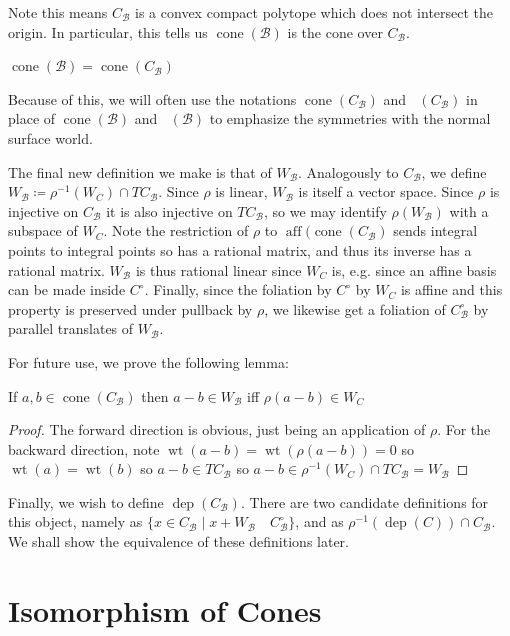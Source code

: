 \documentclass[12pt]{article}
\newcommand{\B}{\mathcal{B}}
\DeclareMathOperator{\dep}{dep}
\DeclareMathOperator{\wt}{wt}
\DeclareMathOperator{\cone}{cone^\circ}
\DeclareMathOperator{\ccone}{cone}
\DeclareMathOperator{\aff}{aff}
\theoremstyle{nonumberdefinition}
\theoremstyle{empty}
\theoremstyle{empty}
\begin{document}
Note this means $C_{\B}$ is a convex compact polytope which does not intersect the origin. In particular, this tells us $\ccone(\B)$ is the cone over $C_{\B}$.

\begin{corollary}\label{cor:ccone(B)=ccone(C_B)}
	$\ccone(\B) = \ccone(C_{\B})$
\end{corollary}

Because of this, we will often use the notations $\ccone(C_{\B})$ and $\cone(C_{\B})$ in place of $\ccone(\B)$ and $\cone(\B)$ to emphasize the symmetries with the normal surface world.

The final new definition we make is that of $W_{\B}$. Analogously to $C_{\B}$, we define $W_{\B} \coloneqq \rho^{-1}(W_C) \cap TC_\B$. Since $\rho$ is linear, $W_{\B}$ is itself a vector space. Since $\rho$ is injective on $C_\B$ it is also injective on $TC_\B$, so we may identify $\rho(W_\B)$ with a subspace of $W_C$. Note the restriction of $\rho$ to $\aff(\ccone(C_\B)$ sends integral points to integral points so has a rational matrix, and thus its inverse has a rational matrix. $W_\B$ is thus rational linear since $W_C$ is, e.g. since an affine basis can be made inside $C^\circ$. Finally, since the foliation by $C^\circ$ by $W_C$ is affine and this property is preserved under pullback by $\rho$, we likewise get a foliation of $C_{\B}^\circ$ by parallel translates of $W_{\B}$.

For future use, we prove the following lemma:
\begin{lemma}\label{lemma:a-bInW_Biffrho(a-b)InW_C}
	If $a,b \in \ccone(C_\B)$ then $a - b \in W_\B$ iff $\rho(a-b) \in W_C$ 
\end{lemma}
\begin{proof}
	The forward direction is obvious, just being an application of $\rho$. For the backward direction, note $\wt(a-b) = \wt(\rho(a-b))= 0$ so $\wt(a) = \wt(b)$ so $a-b \in T C_\B$ so $a-b \in \rho^{-1}(W_C) \cap TC_\B = W_\B$
\end{proof}

Finally, we wish to define $\dep(C_\B)$. There are two candidate definitions for this object, namely as $\{x \in C_\B \mid x + W_\B$ \,\, $C^\circ_\B\}$, and as $\rho^{-1}(\dep(C)) \cap C_\B$. We shall show the equivalence of these definitions later.

\section{Isomorphism of Cones}
\end{document}
